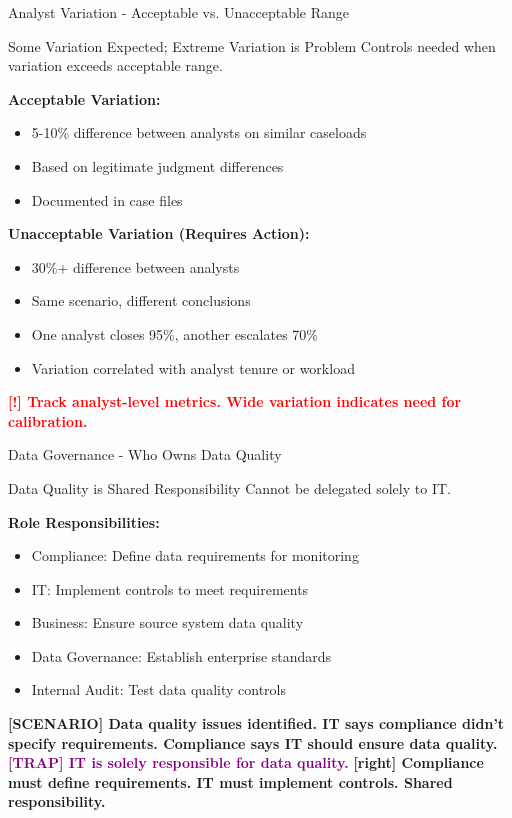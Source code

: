 \documentclass[11pt,a4paper]{beamer}
\newcommand{\redflag}[1]{\textcolor{red}{\textbf{[!] #1}}}
\newcommand{\trap}[1]{\textcolor{purple}{\textbf{[TRAP] #1}}}
\newcommand{\correct}[1]{\textcolor{green!50!black}{\textbf{[right] #1}}}
\newcommand{\scenario}[1]{\textcolor{blue!70!black}{\textbf{[SCENARIO] #1}}}
\begin{document}
\begin{frame}{Analyst Variation - Acceptable vs. Unacceptable Range}
\begin{block}{Some Variation Expected; Extreme Variation is Problem}
Controls needed when variation exceeds acceptable range.
\end{block}
\textbf{Acceptable Variation:}
\begin{itemize}
\item 5-10\% difference between analysts on similar caseloads
\item Based on legitimate judgment differences
\item Documented in case files
\end{itemize}
\textbf{Unacceptable Variation (Requires Action):}
\begin{itemize}
\item 30\%+ difference between analysts
\item Same scenario, different conclusions
\item One analyst closes 95\%, another escalates 70\%
\item Variation correlated with analyst tenure or workload
\end{itemize}
\redflag{Track analyst-level metrics. Wide variation indicates need for calibration.}
\end{frame}


\begin{frame}{Data Governance - Who Owns Data Quality}
\begin{block}{Data Quality is Shared Responsibility}
Cannot be delegated solely to IT.
\end{block}
\textbf{Role Responsibilities:}
\begin{itemize}
\item Compliance: Define data requirements for monitoring
\item IT: Implement controls to meet requirements
\item Business: Ensure source system data quality
\item Data Governance: Establish enterprise standards
\item Internal Audit: Test data quality controls
\end{itemize}
\scenario{Data quality issues identified. IT says compliance didn't specify requirements. Compliance says IT should ensure data quality.}
\trap{IT is solely responsible for data quality.}
\correct{Compliance must define requirements. IT must implement controls. Shared responsibility.}
\end{frame}
\end{document}
